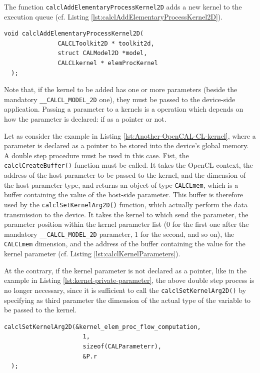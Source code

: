 The function \verb'calclAddElementaryProcessKernel2D' adds a new
kernel to the execution queue
(cf. Listing \ref{lst:calclAddElementaryProcessKernel2D}).

\begin{lstlisting}[float,floatplacement=H, label=lst:calclAddElementaryProcessKernel2D, caption=The calclCreateToolkit2D function., numbers=none]
  void calclAddElementaryProcessKernel2D(
               CALCLToolkit2D * toolkit2d,
               struct CALModel2D *model,
               CALCLkernel * elemProcKernel
  );
\end{lstlisting}

Note that, if the kernel to be added has one or more parameters
(beside the mandatory \verb'__CALCL_MODEL_2D' one), they must be
passed to the device-side application. Passing a parameter to a
kernels is a operation which depends on how the parameter is declared:
if as a pointer or not.

Let as consider the example in Listing
\ref{lst:Another-OpenCAL-CL-kernel}, where a parameter is declared as
a pointer to be stored into the device's global memory. A double step
procedure must be used in this case. Fist, the
\verb'calclCreateBuffer()' function must be called. It takes the
OpenCL context, the address of the host parameter to be passed to the
kernel, and the dimension of the host parameter type, and returns an
object of type \verb'CALCLmem', which is a buffer containing the value
of the host-side parameter. This buffer is therefore used by the
\verb'calclSetKernelArg2D()' function, which actually perform the data
transmission to the device. It takes the kernel to which send the
parameter, the parameter position within the kernel parameter list (0
for the first one after the mandatory \verb'__CALCL_MODEL_2D'
parameter, 1 for the second, and so on), the \verb'CALCLmem'
dimension, and the address of the buffer containing the value for the
kernel parameter (cf. Listing \ref{lst:calclKernelParameters}).

At the contrary, if the kernel parameter is not declared as a pointer,
like in the example in Listing \ref{lst:kernel-private-parameter}, the
above double step process is no longer necessary, since it is
sufficient to call the \verb'calclSetKernelArg2D()' by specifying as
third parameter the dimension of the actual type of the variable to be
passed to the kernel. 


\begin{lstlisting}[float,floatplacement=H, label=lst:calclSetKernelArg2D, caption=The calclSetKernelArg2D() function., numbers=none]
  calclSetKernelArg2D(&kernel_elem_proc_flow_computation,
                      1,
                      sizeof(CALParameterr),
                      &P.r
  );
\end{lstlisting}


